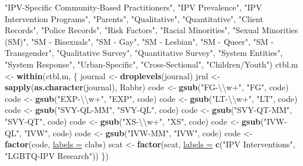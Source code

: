 \documentclass[]{tufte-handout}
\newenvironment{Shaded}{}{}
\newcommand{\KeywordTok}[1]{\textbf{{#1}}}
\newcommand{\DataTypeTok}[1]{\underline{{#1}}}
\newcommand{\CharTok}[1]{{#1}}
\newcommand{\StringTok}[1]{{#1}}
\newcommand{\NormalTok}[1]{{#1}}
\begin{document}
\begin{Shaded}
\begin{Highlighting}[]
    \StringTok{"IPV-Specific Community-Based Practitioners"}\NormalTok{, }\StringTok{"IPV Prevalence"}\NormalTok{, }
    \StringTok{"IPV Intervention Programs"}\NormalTok{, }\StringTok{"Parents"}\NormalTok{, }\StringTok{"Qualitative"}\NormalTok{, }\StringTok{"Quantitative"}\NormalTok{, }
    \StringTok{"Client Records"}\NormalTok{, }\StringTok{"Police Records"}\NormalTok{, }\StringTok{"Risk Factors"}\NormalTok{, }\StringTok{"Racial Minorities"}\NormalTok{, }
    \StringTok{"Sexual Minorities (SM)"}\NormalTok{, }\StringTok{"SM - Bisexuals"}\NormalTok{, }\StringTok{"SM - Gay"}\NormalTok{, }\StringTok{"SM - Lesbian"}\NormalTok{, }
    \StringTok{"SM - Queer"}\NormalTok{, }\StringTok{"SM - Transgender"}\NormalTok{, }\StringTok{"Qualitative Survey"}\NormalTok{, }\StringTok{"Quantitative Survey"}\NormalTok{, }
    \StringTok{"System Entities"}\NormalTok{, }\StringTok{"System Response"}\NormalTok{, }\StringTok{"Urban-Specific"}\NormalTok{, }\StringTok{"Cross-Sectional"}\NormalTok{, }
    \StringTok{"Children/Youth"}\NormalTok{)}
\NormalTok{ctbl.m <-}\StringTok{ }\KeywordTok{within}\NormalTok{(ctbl.m, \{}
    \NormalTok{journal <-}\StringTok{ }\KeywordTok{droplevels}\NormalTok{(journal)}
    \NormalTok{jrnl <-}\StringTok{ }\KeywordTok{sapply}\NormalTok{(}\KeywordTok{as.character}\NormalTok{(journal), Rabbr)}
    \NormalTok{code <-}\StringTok{ }\KeywordTok{gsub}\NormalTok{(}\StringTok{"FG-}\CharTok{\textbackslash{}\textbackslash{}}\StringTok{w+"}\NormalTok{, }\StringTok{"FG"}\NormalTok{, code)}
    \NormalTok{code <-}\StringTok{ }\KeywordTok{gsub}\NormalTok{(}\StringTok{"EXP-}\CharTok{\textbackslash{}\textbackslash{}}\StringTok{w+"}\NormalTok{, }\StringTok{"EXP"}\NormalTok{, code)}
    \NormalTok{code <-}\StringTok{ }\KeywordTok{gsub}\NormalTok{(}\StringTok{"LT-}\CharTok{\textbackslash{}\textbackslash{}}\StringTok{w+"}\NormalTok{, }\StringTok{"LT"}\NormalTok{, code)}
    \NormalTok{code <-}\StringTok{ }\KeywordTok{gsub}\NormalTok{(}\StringTok{"SVY-QL-MM"}\NormalTok{, }\StringTok{"SVY-QL"}\NormalTok{, code)}
    \NormalTok{code <-}\StringTok{ }\KeywordTok{gsub}\NormalTok{(}\StringTok{"SVY-QT-MM"}\NormalTok{, }\StringTok{"SVY-QT"}\NormalTok{, code)}
    \NormalTok{code <-}\StringTok{ }\KeywordTok{gsub}\NormalTok{(}\StringTok{"XS-}\CharTok{\textbackslash{}\textbackslash{}}\StringTok{w+"}\NormalTok{, }\StringTok{"XS"}\NormalTok{, code)}
    \NormalTok{code <-}\StringTok{ }\KeywordTok{gsub}\NormalTok{(}\StringTok{"IVW-QL"}\NormalTok{, }\StringTok{"IVW"}\NormalTok{, code)}
    \NormalTok{code <-}\StringTok{ }\KeywordTok{gsub}\NormalTok{(}\StringTok{"IVW-MM"}\NormalTok{, }\StringTok{"IVW"}\NormalTok{, code)}
    \NormalTok{code <-}\StringTok{ }\KeywordTok{factor}\NormalTok{(code, }\DataTypeTok{labels =} \NormalTok{clabs)}
    \NormalTok{scat <-}\StringTok{ }\KeywordTok{factor}\NormalTok{(scat, }\DataTypeTok{labels =} \KeywordTok{c}\NormalTok{(}\StringTok{"IPV Interventions"}\NormalTok{, }\StringTok{"LGBTQ-IPV Research"}\NormalTok{))}
\NormalTok{\})}
\end{Highlighting}
\end{Shaded}
\end{document}
